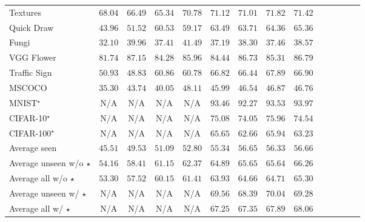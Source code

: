 \begin{table*}[t!]
{\begin{tabular}{lccccccccccccc}
    Textures &\quad\; $68.04$ &\quad\; $66.49$ &\quad\; $65.34$ &\quad\; $70.78$ &\quad\; $71.12$ &\quad\; $71.01$ &\quad\; $\mathbf{71.82}$ &\quad\; $71.42$\\
    Quick Draw &\quad\; $43.96$ &\quad\; $51.52$ &\quad\; $60.53$ &\quad\; $59.17$ &\quad\; $63.49$ &\quad\; $63.71$ &\quad\; $64.36$ &\quad\; $\mathbf{65.36}$\\
    Fungi &\quad\; $32.10$ &\quad\; $39.96$ &\quad\; $37.41$ &\quad\; $41.49$ &\quad\; $37.19$ &\quad\; $38.30$ &\quad\; $37.46$ &\quad\; $\mathbf{38.57}$\\
    VGG Flower &\quad\; $81.74$ &\quad\; $87.15$ &\quad\; $84.28$ &\quad\; $85.96$ &\quad\; $84.44$ &\quad\; $86.73$ &\quad\; $85.31$ &\quad\; $\mathbf{86.79}$\\
    Traffic Sign &\quad\; $50.93$ &\quad\; $48.83$ &\quad\; $60.86$ &\quad\; $60.78$ &\quad\; $66.82$ &\quad\; $66.44$ &\quad\; $67.89$ &\quad\; $\mathbf{66.90}$\\
    MSCOCO &\quad\; $35.30$ &\quad\; $43.74$ &\quad\; $40.05$ &\quad\; $48.11$ &\quad\; $45.99$ &\quad\; $46.54$ &\quad\; $\mathbf{46.87}$ &\quad\; $46.76$\\
    MNIST$^{\star}$ &\quad\; N/A &\quad\; N/A &\quad\; N/A &\quad\; N/A &\quad\; $93.46$ &\quad\; $92.27$ &\quad\; $93.53$ &\quad\; $\mathbf{93.97}$\\
    CIFAR-10$^{\star}$ &\quad\; N/A &\quad\; N/A &\quad\; N/A &\quad\; N/A &\quad\; $75.08$ &\quad\; $74.05$ &\quad\; $\mathbf{75.96}$ &\quad\; $74.54$\\
    CIFAR-100$^{\star}$ &\quad\; N/A &\quad\; N/A &\quad\; N/A &\quad\; N/A &\quad\; $65.65$ &\quad\; $62.66$ &\quad\; $\mathbf{65.94}$ &\quad\; $63.23$\\
    \midrule
    Average seen &\quad\; $45.51$ &\quad\; $49.53$ &\quad\; $51.09$ &\quad\; $52.80$ &\quad\; $55.34$ &\quad\; $56.65$ &\quad\; $56.33$ &\quad\; $\mathbf{56.66}$\\
    \midrule
    Average unseen w/o $\star$ &\quad\; $54.16$ &\quad\; $58.41$ &\quad\; $61.15$ &\quad\; $62.37$ &\quad\; $64.89$ &\quad\; $65.65$ &\quad\; $65.64$ &\quad\; $\mathbf{66.26}$\\
    Average all w/o $\star$ &\quad\; $53.30$ &\quad\; $57.52$ &\quad\; $60.15$ &\quad\; $61.41$ &\quad\; $63.93$ &\quad\; $64.66$ &\quad\; $64.71$ &\quad\; $\mathbf{65.30}$\\
    \midrule
    Average unseen w/ $\star$ &\quad\; N/A &\quad\; N/A &\quad\; N/A &\quad\; N/A &\quad\; $69.56$ &\quad\; $68.39$ &\quad\; $\mathbf{70.04}$ &\quad\; $69.28$\\
    Average all w/ $\star$ &\quad\; N/A &\quad\; N/A &\quad\; N/A &\quad\; N/A &\quad\; $67.25$ &\quad\; $67.35$ &\quad\; $67.89$ &\quad\; $\mathbf{68.06}$\\
    \bottomrule
  \end{tabular}
  }
  \label{tab:img_metadataset}
\end{table*}


